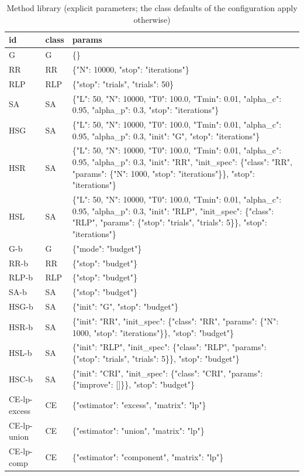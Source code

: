 \begin{table}[htbp]
\centering
\small
\caption{Method library (explicit parameters; the class defaults of the configuration apply otherwise)}
\label{tab:method_library}
\begin{tabular}{lll}
\toprule
id & class & params \\
\midrule
G & G & \{\} \\
RR & RR & \{"N": 10000, "stop": "iterations"\} \\
RLP & RLP & \{"stop": "trials", "trials": 50\} \\
SA & SA & \{"L": 50, "N": 10000, "T0": 100.0, "Tmin": 0.01, "alpha\_c": 0.95, "alpha\_p": 0.3, "stop": "iterations"\} \\
HSG & SA & \{"L": 50, "N": 10000, "T0": 100.0, "Tmin": 0.01, "alpha\_c": 0.95, "alpha\_p": 0.3, "init": "G", "stop": "iterations"\} \\
HSR & SA & \{"L": 50, "N": 10000, "T0": 100.0, "Tmin": 0.01, "alpha\_c": 0.95, "alpha\_p": 0.3, "init": "RR", "init\_spec": \{"class": "RR", "params": \{"N": 1000, "stop": "iterations"\}\}, "stop": "iterations"\} \\
HSL & SA & \{"L": 50, "N": 10000, "T0": 100.0, "Tmin": 0.01, "alpha\_c": 0.95, "alpha\_p": 0.3, "init": "RLP", "init\_spec": \{"class": "RLP", "params": \{"stop": "trials", "trials": 5\}\}, "stop": "iterations"\} \\
G-b & G & \{"mode": "budget"\} \\
RR-b & RR & \{"stop": "budget"\} \\
RLP-b & RLP & \{"stop": "budget"\} \\
SA-b & SA & \{"stop": "budget"\} \\
HSG-b & SA & \{"init": "G", "stop": "budget"\} \\
HSR-b & SA & \{"init": "RR", "init\_spec": \{"class": "RR", "params": \{"N": 1000, "stop": "iterations"\}\}, "stop": "budget"\} \\
HSL-b & SA & \{"init": "RLP", "init\_spec": \{"class": "RLP", "params": \{"stop": "trials", "trials": 5\}\}, "stop": "budget"\} \\
HSC-b & SA & \{"init": "CRI", "init\_spec": \{"class": "CRI", "params": \{"improve": []\}\}, "stop": "budget"\} \\
CE-lp-excess & CE & \{"estimator": "excess", "matrix": "lp"\} \\
CE-lp-union & CE & \{"estimator": "union", "matrix": "lp"\} \\
CE-lp-comp & CE & \{"estimator": "component", "matrix": "lp"\} \\

\end{tabular}
\end{table}
